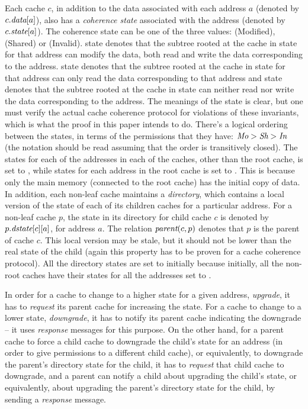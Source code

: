 Each cache $c$, in addition to the data associated with each address $a$ (denoted
by $c.\textit{data}[a]$), also has a \emph{coherence state} associated with the
address (denoted by $c.\textit{state}[a]$). The coherence state can be
one of the three values: \Mo{} (Modified), \Sh{} (Shared) or \In{} (Invalid).
\Mo{} state denotes that the subtree rooted at the cache in \Mo{} state for
that address can modify the data, \ie{} both read and write the data
corresponding to the address. \Sh{} state denotes that the subtree rooted at
the cache in \Sh{} state for that address can only read the data corresponding
to that address and \In{} state denotes that the subtree rooted at the cache in
\In{} state can neither read nor write the data corresponding to the address.
The meanings of the state is clear, but one must verify the actual cache
coherence protocol for violations of these invariants, which is what the proof
in this paper intends to do.  There's a logical ordering between the states, in
terms of the permissions that they have: $\textit{Mo} > \textit{Sh} > \textit{In}$ (the notation should
be read assuming that the order is transitively closed). The states for each of
the addresses in each of the caches, other than the root cache, is set to \In,
while states for each address in the root cache is set to \Mo. This is because
only the main memory (connected to the root cache) has the initial copy of
data.  In addition, each non-leaf cache maintains a \emph{directory}, which
contains a local version of the state of each of its children caches for a
particular address.  For a non-leaf cache $p$, the state in its directory for
child cache $c$ is denoted by $p.\textit{dstate}[c][a]$, for address $a$.  The relation
$\textit{parent}(c, p)$ denotes that $p$ is the parent of cache $c$.  This local
version may be stale, but it should not be lower than the real state of the
child (again this property has to be proven for a cache coherence protocol).
All the directory states are set to \In initially because initially, all the
non-root caches have their states for all the addresses set to \In.

In order for a cache to change to a higher state for a given address, \ie
\emph{upgrade}, it has to \emph{request} its parent cache for increasing the
state.  For a cache to change to a lower state, \ie \emph{downgrade}, it has to
notify its parent cache indicating the downgrade -- it uses \emph{response}
messages for this purpose. On the other hand, for a parent cache to force a
child cache to downgrade the child's state for an address (in order to give
permissions to a different child cache), or equivalently, to downgrade the
parent's directory state for the child, it has to \emph{request} that child
cache to downgrade, and a parent can notify a child about upgrading the child's
state, or equivalently, about upgrading the parent's directory state for the
child, by sending a \emph{response} message.


